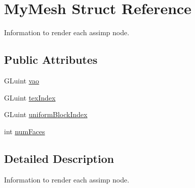 \hypertarget{structMyMesh}{\section{My\-Mesh Struct Reference}
\label{structMyMesh}
}


Information to render each assimp node.  


\subsection*{Public Attributes}
\begin{DoxyCompactItemize}
\item 
G\-Luint \hyperlink{structMyMesh_a2e84e6ea2bf5ce3aa936e456577e7721}{vao}
\item 
G\-Luint \hyperlink{structMyMesh_a793a930c901855b9f8bdbeb065070a80}{tex\-Index}
\item 
G\-Luint \hyperlink{structMyMesh_a6428d32d0468cf606522c4f4f838d26d}{uniform\-Block\-Index}
\item 
int \hyperlink{structMyMesh_a39b1f0dd832a9e67517cd0f11183a45f}{num\-Faces}
\end{DoxyCompactItemize}


\subsection{Detailed Description}
Information to render each assimp node. 

